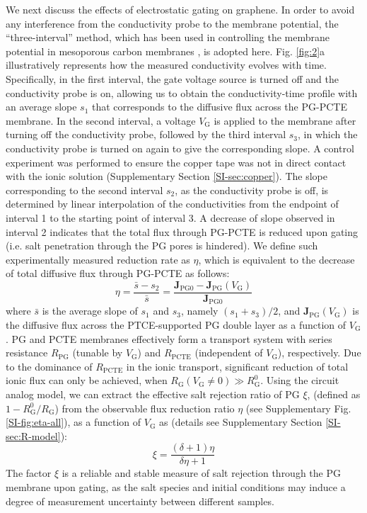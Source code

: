 \documentclass[journal=langd5,email=true, hyperref=true, keywords=false]{achemso}
\newcommand{\Fig}{Fig.}
\begin{document}
We next discuss the effects of electrostatic gating on graphene. In
order to avoid any interference from the conductivity probe to the
membrane potential, the ``three-interval'' method, which has been used
in controlling the membrane potential in mesoporous carbon membranes
\cite{Surwade_2014}, is adopted here. \Fig{} \ref{fig:2}a
illustratively represents how the measured conductivity evolves with
time. Specifically, in the first interval, the gate voltage source is
turned off and the conductivity probe is on, allowing us to obtain the
conductivity-time profile with an average slope $s_{1}$ that
corresponds to the diffusive flux across the PG-PCTE membrane. In the
second interval, a voltage $V_{\mathrm{G}}$ is applied to the membrane
after turning off the conductivity probe, followed by the third
interval $s_{3}$, in which the conductivity probe is turned on again
to give the corresponding slope. A control experiment was performed to
ensure the copper tape was not in direct contact with the ionic
solution (Supplementary Section \ref{SI-sec:copper}). The slope
corresponding to the second interval $s_{2}$, as the conductivity
probe is off, is determined by linear interpolation of the
conductivities from the endpoint of interval 1 to the starting point
of interval 3. A decrease of slope observed in interval 2 indicates
that the total flux through PG-PCTE is reduced upon gating (i.e. salt
penetration through the PG pores is hindered). We define such
experimentally measured reduction rate as $\eta$, which is equivalent
to the decrease of total diffusive flux through PG-PCTE as follows:
\begin{equation}
  \label{eq:rejection}
  \eta = \frac{\bar{s} - s_{2}}{\bar{s}} = \frac{\boldsymbol{J}_{\mathrm{PG0}}
    - \boldsymbol{J}_{\mathrm{PG}}(V_{\mathrm{G}})}{\boldsymbol{J}_{\mathrm{PG0}}}
\end{equation}
where $\bar{s}$ is the average slope of $s_{1}$ and $s_{3}$, namely
$(s_{1} + s_{3})/2$, and
$\boldsymbol{J}_{\mathrm{PG}}(V_{\mathrm{G}})$ is the diffusive flux
across the PTCE-supported PG double layer as a function of
$V_{\mathrm{G}}$. PG and PCTE membranes effectively form a transport
system with series resistance $R_{\mathrm{PG}}$ (tunable by
$V_{\mathrm{G}}$) and $R_{\mathrm{PCTE}}$ (independent of
$V_{\mathrm{G}}$), respectively. Due to the dominance of
$R_{\mathrm{PCTE}}$ in the ionic transport, significant reduction of
total ionic flux can only be achieved, when
$R_{\mathrm{\mathrm{G}}}(V_{\mathrm{G}} \neq 0) \gg
R_{\mathrm{\mathrm{G}}}^{0}$. Using the circuit analog model, we can
extract the effective salt rejection ratio of PG $\xi$, (defined as
$1 - R_{\mathrm{G}}^{0}/R_{\mathrm{G}}$) from the observable flux
reduction ratio $\eta$ (see Supplementary \Fig{}
\ref{SI-fig:eta-all}), as a function of $V_{\mathrm{G}}$ as (details
see Supplementary Section \ref{SI-sec:R-model}):
\begin{equation}
\label{eq:xi-def}
\xi = \frac{(\delta+1) \eta}{\delta \eta + 1}
\end{equation}
The factor $\xi$ is a reliable and stable measure of salt rejection
through the PG membrane upon gating, as the salt species and initial
conditions may induce a degree of measurement uncertainty between
different samples.
\end{document}
